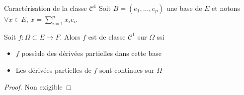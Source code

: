 \begin{theoreme}{Caractérisation de la classe $\mathscr C^1$}{}
    Soit $B = (e_1, \ldots, e_p)$ une base de $E$ et notons $\forall x \in E$, 
    $x = \displaystyle \sum_{i = 1 }^{p } x_i e_i$.

    Soit $f : \Omega \subset E \to F$. Alors $f$ est de classe $\mathscr C^1$ sur $\Omega$ ssi
    \begin{itemize}
        \item $f$ possède des dérivées partielles dans cette base 
        \item Les dérivées partielles de $f$ sont continues sur $\Omega$
    \end{itemize}
\end{theoreme}

\begin{proof}
    Non exigible 
\end{proof}

